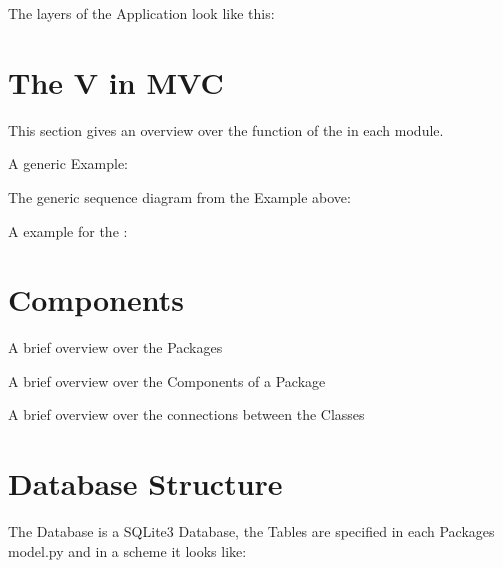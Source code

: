 \documentclass[letterpaper,10pt,english]{sphinxmanual}
\begin{document}

The layers of the Application look like this:



\section{The V in MVC}
\label{\detokenize{masterDeveloperDoc:the-v-in-mvc}}
This section gives an overview over the function of the  in each
module.

A generic Example:


The generic sequence diagram from the Example above:


A example for the :



\section{Components}
\label{\detokenize{masterDeveloperDoc:components}}
A brief overview over the Packages


A brief overview over the Components of a Package


A brief overview over the connections between the Classes



\section{Database Structure}
\label{\detokenize{masterDeveloperDoc:database-structure}}
The Database is a SQLite3 Database, the Tables are specified in each Packages
model.py and in a scheme it looks like:
\end{document}
